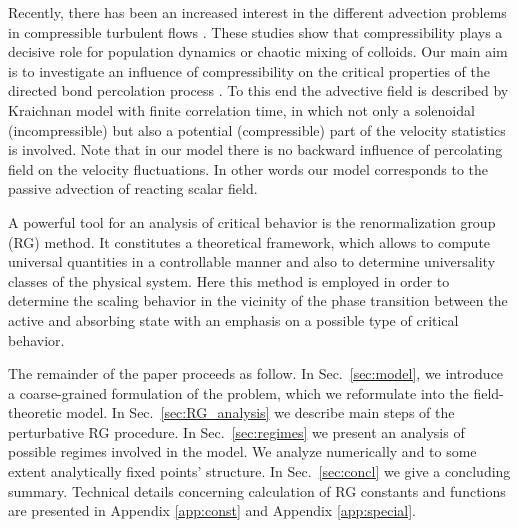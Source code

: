 \documentclass[aps,pre,url,twocolumn,superscriptaddress]{revtex4-1}
\begin{document}
Recently, there has been an increased interest in the different advection problems in 
compressible turbulent flows \cite{Benzi09,Pig12,Volk14}. These studies show that
compressibility plays a decisive role for population dynamics or chaotic mixing of colloids.
 Our main aim is to investigate an influence of 
 compressibility \cite{AdzAnt98,Ant00}
 on the critical properties of the directed bond percolation process \cite{HHL08}. 
  To this end
  the advective field is described by Kraichnan model with finite correlation time, in which
  not only a solenoidal (incompressible) but also
 a potential (compressible) part of the velocity statistics is involved.
 Note that in our model there is no backward influence of percolating
 field on the velocity fluctuations. In other words our model corresponds to
 the passive advection of reacting scalar field.

A powerful tool for an analysis of critical behavior is the renormalization group (RG) 
\cite{Amit,Zinn,Vasiliev} method. 
It constitutes a theoretical framework, which allows to compute universal
quantities in a controllable manner and also to determine universality classes of
the physical system. Here this method is employed in order to
determine the scaling behavior in the vicinity of the phase transition
between the active and absorbing state with an emphasis on a possible type of critical behavior.

The remainder of the paper proceeds as follow. In 
 Sec.~\ref{sec:model}, we introduce a
coarse-grained formulation of the problem, which we reformulate
 into the field-theoretic model. In Sec.~\ref{sec:RG_analysis} we describe main steps of the
 perturbative RG procedure. In Sec.~\ref{sec:regimes} we present an 
 analysis of possible regimes involved in the model. We analyze numerically
 and to some extent analytically  fixed points' structure.
 In Sec.~\ref{sec:concl} we give a concluding summary. 
 Technical details concerning calculation of RG constants
 and functions are presented in Appendix \ref{app:const} and Appendix \ref{app:special}.
\end{document}
